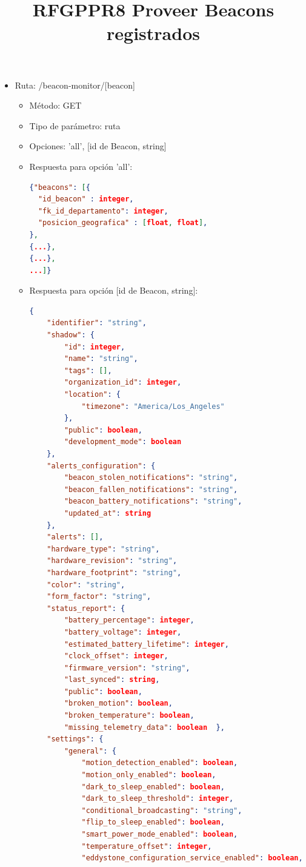 

\title{\textbf{RFGPPR8 Proveer Beacons registrados}}
\begin{itemize}
\item Ruta: /beacon-monitor/[beacon]
\begin{itemize}
\item Método: GET
\item Tipo de parámetro: ruta
\item Opciones: 'all', [id de Beacon, string]
\item Respuesta para opción 'all': 
\begin{lstlisting}[language=json,firstnumber=1]
{"beacons": [{
  "id_beacon" : integer,
  "fk_id_departamento": integer,
  "posicion_geografica" : [float, float],
},
{...},
{...},
...]}
\end{lstlisting}
\item Respuesta para opción [id de Beacon, string]:
\begin{lstlisting}[language=json,firstnumber=1]
{
	"identifier": "string",
    "shadow": {
        "id": integer,
        "name": "string",
        "tags": [],
        "organization_id": integer,
        "location": {
            "timezone": "America/Los_Angeles"
        },
        "public": boolean,
        "development_mode": boolean
    },
    "alerts_configuration": {
        "beacon_stolen_notifications": "string",
        "beacon_fallen_notifications": "string",
        "beacon_battery_notifications": "string",
        "updated_at": string
    },
    "alerts": [],
    "hardware_type": "string",
    "hardware_revision": "string",
    "hardware_footprint": "string",
    "color": "string",
    "form_factor": "string",
    "status_report": {
        "battery_percentage": integer,
        "battery_voltage": integer,
        "estimated_battery_lifetime": integer,
        "clock_offset": integer,
        "firmware_version": "string",
        "last_synced": string,
        "public": boolean,
        "broken_motion": boolean,
        "broken_temperature": boolean,
        "missing_telemetry_data": boolean  },
    "settings": {
        "general": {
            "motion_detection_enabled": boolean,
            "motion_only_enabled": boolean,
            "dark_to_sleep_enabled": boolean,
            "dark_to_sleep_threshold": integer,
            "conditional_broadcasting": "string",
            "flip_to_sleep_enabled": boolean,
            "smart_power_mode_enabled": boolean,
            "temperature_offset": integer,
            "eddystone_configuration_service_enabled": boolean,

\end{lstlisting}
\end{itemize}
\end{itemize}
